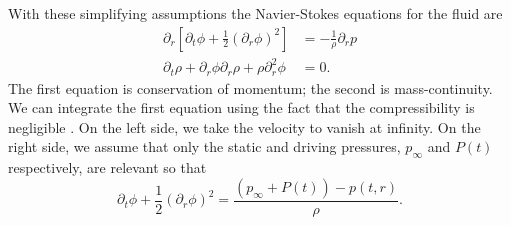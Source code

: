 \documentclass[11pt,prb,aps,nofootinbib,superscriptaddress,floatfix]{revtex4-2}
\begin{document}
With these simplifying assumptions the Navier-Stokes equations for the fluid are \cite{prosperetti1999old,prosperetti1986bubble,leighton2007derivation,brennen2014cavitation}
\begin{equation}
\begin{split}
     \partial_r \left[ \partial_t \phi +\frac{1}{2} \left( \partial_r \phi \right)^2 \right] & = - \frac{1}{\rho} \partial_r p  \\ 
     \partial_t \rho+ \partial_r \phi \partial_r \rho + \rho \partial^2_r \phi & = 0.
     \label{eq:NS_1D}
\end{split}
\end{equation}
The first equation is conservation of momentum; the second is mass-continuity. We can integrate the first equation using the fact that the compressibility is negligible \cite{leighton2007derivation}. On the left side, we take the velocity to vanish at infinity. On the right side, we assume that only the static and driving pressures, $p_\infty$ and $P(t)$ respectively, are relevant so that \cite{prosperetti1999old,prosperetti1986bubble,leighton2007derivation} 
\begin{equation}
    \partial_t \phi + \frac{1}{2}\left( \partial_r \phi \right)^2 = \frac{(p_\infty+P(t))-p(t,r)}{\rho}.
    \label{eq:press_vel}
\end{equation}
\end{document}
